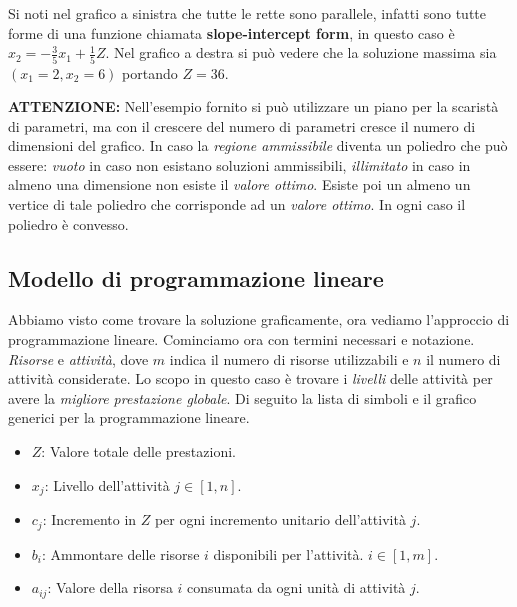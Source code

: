 \documentclass{article}
\begin{document}
Si noti nel grafico a sinistra che tutte le rette sono parallele, infatti sono tutte forme di una funzione chiamata \textbf{slope-intercept form}, in questo caso è $x_2=-\frac{3}{5}x_1+\frac{1}{5}Z$. Nel grafico a destra si può vedere che la soluzione massima sia $(x_1=2,x_2=6)$ portando $Z=36$.

\begin{tcolorbox}[breakable]
  \textbf{ATTENZIONE:}
  Nell'esempio fornito si può utilizzare un piano per la scaristà di parametri, ma con il crescere del numero di parametri cresce il numero di dimensioni del grafico. In caso la \textit{regione ammissibile} diventa un poliedro che può essere: \textit{vuoto} in caso non esistano soluzioni ammissibili, \textit{illimitato} in caso in almeno una dimensione non esiste il \textit{valore ottimo}. Esiste poi un almeno un vertice di tale poliedro che corrisponde ad un \textit{valore ottimo}. In ogni caso il poliedro è convesso.

\end{tcolorbox}

\subsection{Modello di programmazione lineare}
Abbiamo visto come trovare la soluzione graficamente, ora vediamo l'approccio di programmazione lineare. Cominciamo ora con termini necessari e notazione. \textit{Risorse} e \textit{attività}, dove $m$ indica il numero di risorse utilizzabili e $n$ il numero di attività considerate. Lo scopo in questo caso è trovare i \textit{livelli} delle attività per avere la \textit{migliore prestazione globale}. Di seguito la lista di simboli e il grafico generici per la programmazione lineare.
\begin{itemize}
  \item $Z$: Valore totale delle prestazioni.
  \item $x_j$: Livello dell'attività $j\in[1,n]$.
  \item $c_j$: Incremento in $Z$ per ogni incremento unitario dell'attività $j$.
  \item $b_i$: Ammontare delle risorse $i$ disponibili per l'attività. $i\in[1,m]$.
  \item $a_{ij}$: Valore della risorsa $i$ consumata da ogni unità di attività $j$.
\end{itemize}
\end{document}
